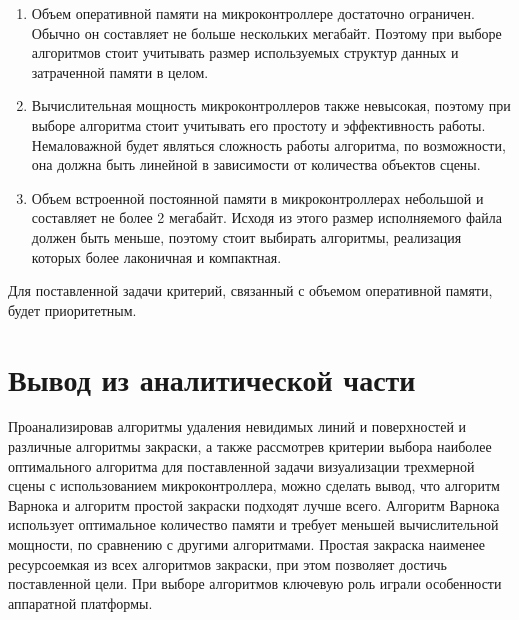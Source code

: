 \begin{enumerate}
    \item Объем оперативной памяти на микроконтроллере достаточно ограничен. 
    Обычно он составляет не больше нескольких мегабайт. 
    Поэтому при выборе алгоритмов стоит учитывать размер используемых структур данных и затраченной памяти в целом.
    \item Вычислительная мощность микроконтроллеров также невысокая, поэтому при выборе алгоритма стоит учитывать его простоту и эффективность работы. 
    Немаловажной будет являться сложность работы алгоритма, по возможности, она должна быть линейной в зависимости от количества объектов сцены. 
    \item Объем встроенной постоянной памяти в микроконтроллерах небольшой и составляет не более 2 мегабайт. 
    Исходя из этого размер исполняемого файла должен быть меньше, поэтому стоит выбирать алгоритмы, реализация которых более лаконичная и компактная.
\end{enumerate}

Для поставленной задачи критерий, связанный с объемом оперативной памяти, будет приоритетным.

\section{Вывод из аналитической части}

Проанализировав алгоритмы удаления невидимых линий и поверхностей и различные алгоритмы закраски, а также рассмотрев критерии выбора наиболее оптимального алгоритма для поставленной задачи визуализации трехмерной сцены с использованием микроконтроллера, можно сделать вывод, что алгоритм Варнока и алгоритм простой закраски подходят лучше всего. 
Алгоритм Варнока использует оптимальное количество памяти и требует меньшей вычислительной мощности, по сравнению с другими алгоритмами. 
Простая закраска наименее ресурсоемкая из всех алгоритмов закраски, при этом позволяет достичь поставленной цели. При выборе алгоритмов ключевую роль играли особенности аппаратной платформы.
